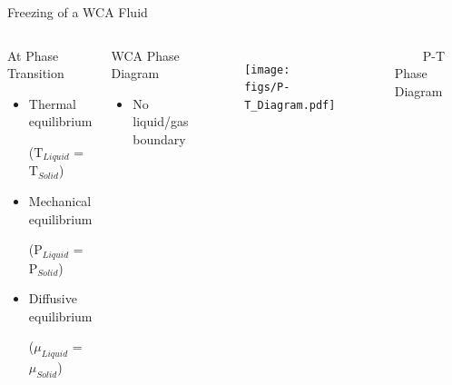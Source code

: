 \documentclass{beamer}
\begin{document}
\begin{frame}{Freezing of a WCA Fluid}
	\begin{columns}[t]
	    \vspace{-0.5em}
         \begin{block}{At Phase Transition}
		     \begin{itemize}
				\item Thermal equilibrium 
				
				($\text{T}_{Liquid}$ = $\text{T}_{Solid}$)
			    \item Mechanical equilibrium 
			    
			    ($\text{P}_{Liquid}$ = $\text{P}_{Solid}$)
				\item Diffusive equilibrium 
				
				($\mu_{Liquid}$ = $\mu_{Solid}$)
			\end{itemize}		
		\end{block}	
		\begin{block}{WCA Phase Diagram}
		     \begin{itemize}
				\item No liquid/gas boundary				
			  \end{itemize}				 
		\end{block}	
	    \vspace{-1.5em}
		\begin{figure}
            \centering
            \texttt{[image: figs/P-T\_Diagram.pdf]}
         \end{figure} 
	    \vspace{-1em}                  
         $~~~~~~~~~~$P-T Phase Diagram
	\end{columns}
    \vspace{+1em}	
\end{frame}
\end{document}

